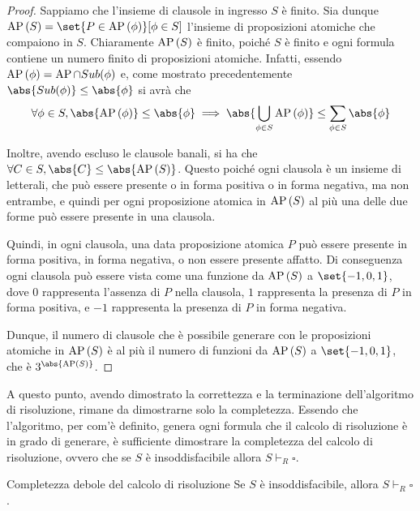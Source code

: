 \begin{proof}
  Sappiamo che l'insieme di clausole in ingresso \(S\) è finito. Sia dunque \(\AP[S] = \set{P \in \AP[\phi]}[\phi \in S]\) l'insieme di proposizioni atomiche che compaiono in \(S\). Chiaramente \(\AP[S]\) è finito, poiché \(S\) è finito e ogni formula contiene un numero finito di proposizioni atomiche. Infatti, essendo \(\AP[\phi] = \AP \cap Sub(\phi)\) e, come mostrato precedentemente \(\abs{Sub(\phi)} \leq \abs{\phi}\) si avrà che
  \[\forall \phi \in S, \abs{\AP[\phi]} \leq \abs{\phi} \implies \abs{\bigcup_{\phi \in S} \AP[\phi]} \leq \sum_{\phi \in S} \abs{\phi}\]

  Inoltre, avendo escluso le clausole banali, si ha che \(\forall C \in S, \abs{C}\leq\abs{\AP[S]}\). Questo poiché ogni clausola è un insieme di letterali, che può essere presente o in forma positiva o in forma negativa, ma non entrambe, e quindi per ogni proposizione atomica in \(\AP[S]\) al più una delle due forme può essere presente in una clausola.

  Quindi, in ogni clausola, una data proposizione atomica \(P\) può essere presente in forma positiva, in forma negativa, o non essere presente affatto. Di conseguenza ogni clausola può essere vista come una funzione da \(\AP[S]\) a \(\set{-1,0,1}\), dove \(0\) rappresenta l'assenza di \(P\) nella clausola, \(1\) rappresenta la presenza di \(P\) in forma positiva, e \(-1\) rappresenta la presenza di \(P\) in forma negativa.

  Dunque, il numero di clausole che è possibile generare con le proposizioni atomiche in \(\AP[S]\) è al più il numero di funzioni da \(\AP[S]\) a \(\set{-1,0,1}\), che è \(3^{\abs{\AP[S]}}\).
\end{proof}

A questo punto, avendo dimostrato la correttezza e la terminazione dell'algoritmo di risoluzione, rimane da dimostrarne solo la completezza. Essendo che l'algoritmo, per com'è definito, genera ogni formula che il calcolo di risoluzione è in grado di generare, è sufficiente dimostrare la completezza del calcolo di risoluzione, ovvero che se \(S\) è insoddisfacibile allora \(S\vdash_R \square\).

\begin{theorem}{Completezza debole del calcolo di risoluzione}
  Se \(S\) è insoddisfacibile, allora \(S\vdash_R \square\).
\end{theorem}

